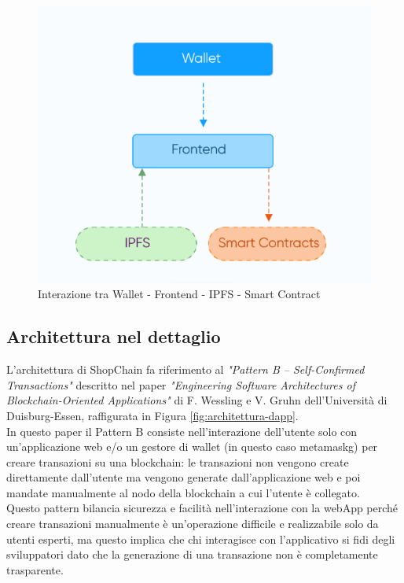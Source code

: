 \begin{figure}[!h] 
    \centering 
    \includegraphics[width=0.9\columnwidth]{immagini/PatternArchitetturale.PNG}
    \caption{Interazione tra Wallet - Frontend - IPFS - Smart Contract \cite{site:dapp-architecture}}
    \label{fig:pattern-architetturale}
\end{figure}

\subsection{Architettura nel dettaglio}
L'architettura di ShopChain fa riferimento al \textit{"Pattern B – Self-Confirmed Transactions"} descritto nel paper \textit{"Engineering Software Architectures of Blockchain-Oriented Applications"} di F. Wessling e V. Gruhn dell'Università di Duisburg-Essen, raffigurata in Figura         \ref{fig:architettura-dapp}.\cite{site:paper-architectures-blockchain-oriented-applications} \\
In questo paper il Pattern B consiste nell'interazione dell'utente solo con un'applicazione web e/o un gestore di wallet (in questo caso \gls{metamaskg}\glsfirstoccur) per creare transazioni su una blockchain: le transazioni non vengono create direttamente dall'utente ma vengono generate dall'applicazione web e poi mandate manualmente al nodo della blockchain a cui l'utente è collegato.\\
Questo pattern bilancia sicurezza e facilità nell'interazione con la webApp perché creare transazioni manualmente è un'operazione difficile e realizzabile solo da utenti esperti, ma questo implica che chi interagisce con l'applicativo si fidi degli sviluppatori dato che la generazione di una transazione non è completamente trasparente.

